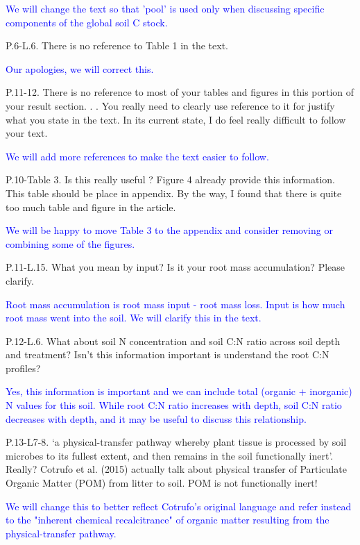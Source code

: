 \documentclass[]{article}
\begin{document}
\textcolor{blue}{We will change the text so that 'pool' is used only when discussing specific components of the global soil C stock.}

P.6-L.6. There is no reference to Table 1 in the text.

\textcolor{blue}{Our apologies, we will correct this.}

P.11-12. There is no reference to most of your tables and figures in
this portion of your result section. . . You really need to clearly use
reference to it for justify what you state in the text. In its current
state, I do feel really difficult to follow your text.

\textcolor{blue}{We will add more references to make the text easier to follow.}

P.10-Table 3. Is this really useful ? Figure 4 already provide this
information. This table should be place in appendix. By the way, I found
that there is quite too much table and figure in the article.

\textcolor{blue}{We will be happy to move Table 3 to the appendix and consider removing or combining some of the figures.}

P.11-L.15. What you mean by input? Is it your root mass accumulation?
Please clarify.

\textcolor{blue}{Root mass accumulation is root mass input - root mass loss. Input is how much root mass went into the soil. We will clarify this in the text.}

P.12-L.6. What about soil N concentration and soil C:N ratio across soil
depth and treatment? Isn't this information important is understand the
root C:N profiles?

\textcolor{blue}{Yes, this information is important and we can include total (organic + inorganic) N values for this soil. While root C:N ratio increases with depth, soil C:N ratio decreases with depth, and it may be useful to discuss this relationship.}

P.13-L7-8. `a physical-transfer pathway whereby plant tissue is
processed by soil microbes to its fullest extent, and then remains in
the soil functionally inert'. Really? Cotrufo et al. (2015) actually
talk about physical transfer of Particulate Organic Matter (POM) from
litter to soil. POM is not functionally inert!

\textcolor{blue}{We will change this to better reflect Cotrufo's original language and refer instead to the "inherent chemical recalcitrance" of organic matter resulting from the physical-transfer pathway.}
\end{document}
